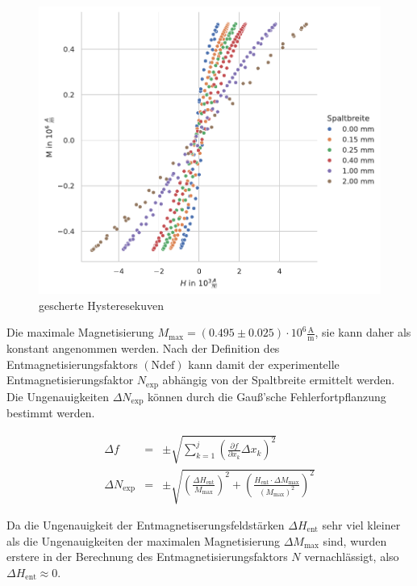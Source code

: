 \documentclass[12pt,a4paper]{scrartcl}
\numberwithin{equation}{section} %
\renewcommand{\[}{} %
\renewcommand{\]}{\noindent} %
\begin{document}
\begin{figure}
\centering
\includegraphics[scale=0.7]{../media/B2.4/3.3.3_overview.pdf}
\caption{gescherte Hysteresekuven}
\label{Abb: Scherung}
\end{figure}

Die maximale Magnetisierung \(M_\mathrm{max} = (0.495\pm 0.025) \cdot 10^6 \mathrm{\frac{A}{m}}\), sie kann daher als konstant angenommen werden. Nach der Definition des Entmagnetisierungsfaktors \((\mathrm{Ndef})\) kann damit der experimentelle Entmagnetisierungsfaktor \(N_\mathrm{exp}\) abhängig von der Spaltbreite ermittelt werden. Die Ungenauigkeiten \(\Delta N_\mathrm{exp}\) können durch die Gauß'sche Fehlerfortpflanzung bestimmt werden.

\begin{eqnarray}
    \Delta f &=& \pm\sqrt{
        \sum_{k=1}^j
            \left(
                \frac{\partial f}{\partial x_k} \Delta x_k
            \right)^2
        } \\
    \Delta N_\mathrm{exp} &=&
        \pm\sqrt{
            \left(\frac{\Delta H_\mathrm{ent}}{M_\mathrm{max}}\right)^2
            + \left(\frac{H_\mathrm{ent}\cdot \Delta M_\mathrm{max}}{(M_\mathrm{max})^2}\right)^2       }
\end{eqnarray}

\noindent
Da die Ungenauigkeit der Entmagnetiserungsfeldstärken \(\Delta H_\mathrm{ent}\) sehr viel kleiner als die Ungenauigkeiten der maximalen Magnetisierung \(\Delta M_\mathrm{max}\) sind, wurden erstere in der Berechnung des Entmagnetisierungsfaktors \(N\) vernachlässigt, also \(\Delta H_\mathrm{ent}\approx 0\).
\end{document}
